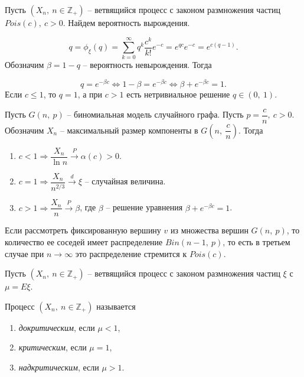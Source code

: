 \begin{example}
Пусть $\displaystyle ( X_{n} ,\ n\in \mathbb{Z}_{+})$ -- ветвящийся процесс с законом размножения частиц $\displaystyle Pois( c) ,\ c >0$. Найдем вероятность вырождения.


\begin{equation*}
q=\phi _{\xi }( q) =\sum _{k=0}^{\infty } q^{k}\dfrac{c^{k}}{k!} e^{-c} =e^{qc} e^{-c} =e^{c( q-1)} .
\end{equation*}
Обозначим $\displaystyle \beta =1-q$ -- вероятность невырождения. Тогда


\begin{equation*}
q=e^{-\beta c} \Leftrightarrow 1-\beta =e^{-\beta c} \Leftrightarrow \beta +e^{-\beta c} =1.
\end{equation*}
Если $\displaystyle c\leqslant 1$, то $\displaystyle q=1$, а при $\displaystyle c >1$ есть нетривиальное решение $\displaystyle q\in ( 0,\ 1)$.
\end{example}
\begin{example}
Пусть $\displaystyle G( n,\ p)$ -- биномиальная модель случайного графа. Пусть $\displaystyle p=\dfrac{c}{n} ,\ c >0$. Обозначим $\displaystyle X_{n}$ -- максимальный размер компоненты в $\displaystyle G\left( n,\ \dfrac{c}{n}\right)$. Тогда

\begin{enumerate}
    \item $\displaystyle c< 1\Rightarrow \dfrac{X_{n}}{\ln n}\xrightarrow{P} \alpha ( c)  >0$.
    \item $\displaystyle c=1\Rightarrow \dfrac{X_{n}}{n^{2/3}}\xrightarrow{d} \xi $ -- случайная величина.
    \item $\displaystyle c >1\Rightarrow \dfrac{X_{n}}{n}\xrightarrow{P} \beta $, где $\displaystyle \beta $ -- решение уравнения $\displaystyle \beta +e^{-\beta c} =1$.
\end{enumerate}
\end{example}
\begin{note}
Если рассмотреть фиксированную вершину $\displaystyle v$ из множества вершин $\displaystyle G( n,\ p)$, то количество ее соседей имеет распределение $\displaystyle Bin( n-1,\ p)$, то есть в третьем случае при $\displaystyle n\rightarrow \infty $ это распределение стремится к $\displaystyle Pois( c)$.
\end{note}
Пусть $\displaystyle ( X_{n} ,\ n\in \mathbb{Z}_{+})$ -- ветвящийся процесс с законом размножения частиц $\displaystyle \xi $ с $\displaystyle \mu =E\xi $.
\begin{definition}
Процесс $\displaystyle ( X_{n} ,\ n\in \mathbb{Z}_{+})$ называется 

\begin{enumerate}
    \item \textit{докритическим}, если $\displaystyle \mu < 1$,
    \item \textit{критическим}, если $\displaystyle \mu =1$,
    \item \textit{надкритическим}, если $\displaystyle \mu  >1$.
\end{enumerate}
\end{definition}
